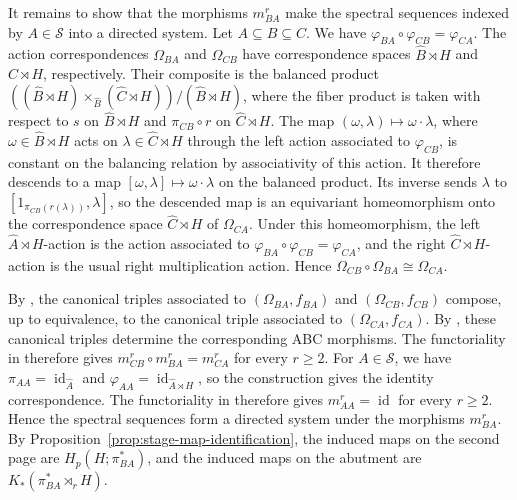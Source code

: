 \documentclass[pdflatex,sn-mathphys-num]{sn-jnl}%
\theoremstyle{plain}
\theoremstyle{remark}
\theoremstyle{definition}
\numberwithin{equation}{section}
\begin{document}
It remains to show that the morphisms \( m_{BA}^r \) make the spectral sequences indexed by \( A\in\mathcal S \) into a directed system. Let \( A\subseteq B\subseteq C \). We have \( \varphi_{BA}\circ\varphi_{CB}=\varphi_{CA} \). The action correspondences \( \Omega_{BA} \) and \( \Omega_{CB} \) have correspondence spaces \( \widehat B\rtimes H \) and \( \widehat C\rtimes H \), respectively. Their composite is the balanced product \( ((\widehat B\rtimes H)\times_{\widehat B}(\widehat C\rtimes H))/(\widehat B\rtimes H) \), where the fiber product is taken with respect to \( s \) on \( \widehat B\rtimes H \) and \( \pi_{CB}\circ r \) on \( \widehat C\rtimes H \). The map \( (\omega,\lambda)\mapsto\omega\cdot\lambda \), where \( \omega\in\widehat B\rtimes H \) acts on \( \lambda\in\widehat C\rtimes H \) through the left action associated to \( \varphi_{CB} \), is constant on the balancing relation by associativity of this action. It therefore descends to a map \( [\omega,\lambda]\mapsto\omega\cdot\lambda \) on the balanced product. Its inverse sends \( \lambda \) to \( [1_{\pi_{CB}(r(\lambda))},\lambda] \), so the descended map is an equivariant homeomorphism onto the correspondence space \( \widehat C\rtimes H \) of \( \Omega_{CA} \). Under this homeomorphism, the left \( \widehat A\rtimes H \)-action is the action associated to \( \varphi_{BA}\circ\varphi_{CB}=\varphi_{CA} \), and the right \( \widehat C\rtimes H \)-action is the usual right multiplication action. Hence \( \Omega_{CB}\circ\Omega_{BA}\cong\Omega_{CA} \).

By \cite[Remark~5.5]{miller2025isomorphisms}, the canonical triples associated to \( (\Omega_{BA},f_{BA}) \) and \( (\Omega_{CB},f_{CB}) \) compose, up to equivalence, to the canonical triple associated to \( (\Omega_{CA},f_{CA}) \). By \cite[Example~5.8]{miller2025isomorphisms}, these canonical triples determine the corresponding ABC morphisms. The functoriality in \cite[Theorem~6.1]{miller2025isomorphisms} therefore gives \( m_{CB}^r\circ m_{BA}^r=m_{CA}^r \) for every \( r\ge2 \). For \( A\in\mathcal S \), we have \( \pi_{AA}=\operatorname{id}_{\widehat A} \) and \( \varphi_{AA}=\operatorname{id}_{\widehat A\rtimes H} \), so the construction gives the identity correspondence. The functoriality in \cite[Theorem~6.1]{miller2025isomorphisms} therefore gives \( m_{AA}^r=\operatorname{id} \) for every \( r\ge2 \). Hence the spectral sequences form a directed system under the morphisms \( m_{BA}^r \). By Proposition~\ref{prop:stage-map-identification}, the induced maps on the second page are \( H_p(H;\pi_{BA}^*) \), and the induced maps on the abutment are \( K_*(\pi_{BA}^*\rtimes_r H) \).
\end{document}

